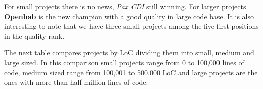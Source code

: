 \begin{table}[htbp]
  \small
  \caption{Projects qualities by number of bundles}
  \label{projects-quality-bundle}
  \hspace{1cm}
\end{table}
\FloatBarrier  
For small projects there is no news, \emph{Pax CDI} still winning. For larger projects \textbf{Openhab} is the new champion with a good quality in large code base. It is also interesting to note that we have three small projects among the five first positions in the quality rank. 

The next table compares projects by LoC dividing them into small, medium and large sized. In this comparison small projects range from 0 to 100,000 lines of code, medium sized range from 100,001 to 500.000 LoC and large projects are the ones with more than half million lines of code:

